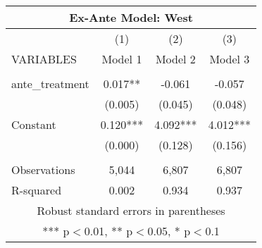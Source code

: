 \begin{tabular}{lccc}
\multicolumn{4}{c}{Ex-Ante Model: West} \\ \hline
 & (1) & (2) & (3) \\
VARIABLES & Model 1 & Model 2 & Model 3 \\ \hline
 &  &  &  \\
ante\_treatment & 0.017** & -0.061 & -0.057 \\
 & (0.005) & (0.045) & (0.048) \\
Constant & 0.120*** & 4.092*** & 4.012*** \\
 & (0.000) & (0.128) & (0.156) \\
 &  &  &  \\
Observations & 5,044 & 6,807 & 6,807 \\
 R-squared & 0.002 & 0.934 & 0.937 \\ \hline
\multicolumn{4}{c}{ Robust standard errors in parentheses} \\
\multicolumn{4}{c}{ *** p$<$0.01, ** p$<$0.05, * p$<$0.1} \\
\end{tabular}
